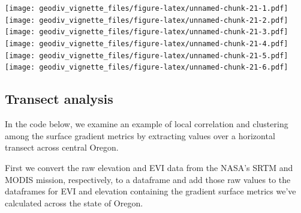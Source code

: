 \documentclass[
]{article}
\newenvironment{Shaded}{\begin{snugshade}}{\end{snugshade}}
\newcommand{\AttributeTok}[1]{\textcolor[rgb]{0.77,0.63,0.00}{#1}}
\newcommand{\CommentTok}[1]{\textcolor[rgb]{0.56,0.35,0.01}{\textit{#1}}}
\newcommand{\ControlFlowTok}[1]{\textcolor[rgb]{0.13,0.29,0.53}{\textbf{#1}}}
\newcommand{\DecValTok}[1]{\textcolor[rgb]{0.00,0.00,0.81}{#1}}
\newcommand{\FunctionTok}[1]{\textcolor[rgb]{0.00,0.00,0.00}{#1}}
\newcommand{\NormalTok}[1]{#1}
\newcommand{\OtherTok}[1]{\textcolor[rgb]{0.56,0.35,0.01}{#1}}
\newcommand{\SpecialCharTok}[1]{\textcolor[rgb]{0.00,0.00,0.00}{#1}}
\begin{document}
\begin{Shaded}
\end{Shaded}

\texttt{[image: geodiv\_vignette\_files/figure-latex/unnamed-chunk-21-1.pdf]}
\texttt{[image: geodiv\_vignette\_files/figure-latex/unnamed-chunk-21-2.pdf]}
\texttt{[image: geodiv\_vignette\_files/figure-latex/unnamed-chunk-21-3.pdf]}
\texttt{[image: geodiv\_vignette\_files/figure-latex/unnamed-chunk-21-4.pdf]}
\texttt{[image: geodiv\_vignette\_files/figure-latex/unnamed-chunk-21-5.pdf]}
\texttt{[image: geodiv\_vignette\_files/figure-latex/unnamed-chunk-21-6.pdf]}

\hypertarget{transect-analysis}{%
\subsection{Transect analysis}\label{transect-analysis}}

In the code below, we examine an example of local correlation and
clustering among the surface gradient metrics by extracting values over
a horizontal transect across central Oregon.

First we convert the raw elevation and EVI data from the NASA's SRTM and
MODIS mission, respectively, to a dataframe and add those raw values to
the dataframes for EVI and elevation containing the gradient surface
metrics we've calculated across the state of Oregon.
\end{document}
